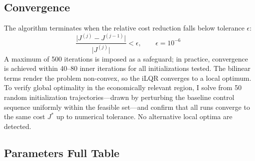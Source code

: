 \documentclass[12pt, a4paper]{article}
\begin{document}
\subsection{Convergence}
\label{app:convergence}

The algorithm terminates when the relative cost reduction falls below
tolerance $\epsilon$:
%
\begin{equation}
    \frac{\bigl|J^{(j)} - J^{(j-1)}\bigr|}{\bigl|J^{(j)}\bigr|} < \epsilon,
    \qquad \epsilon = 10^{-6}
    \label{eq:convergence}
\end{equation}
%
A maximum of 500 iterations is imposed as a safeguard; in practice,
convergence is achieved within 40--80 inner iterations for all
initializations tested. The bilinear terms render the problem non-convex, so
the iLQR converges to a local optimum. To verify global optimality in the
economically relevant region, I solve from 50 random initialization
trajectories---drawn by perturbing the baseline control sequence uniformly
within the feasible set---and confirm that all runs converge to the same cost
$J^*$ up to numerical tolerance. No alternative local optima are detected.

\subsection{Parameters Full Table}
\label{subsec:full_parameter}
\end{document}
